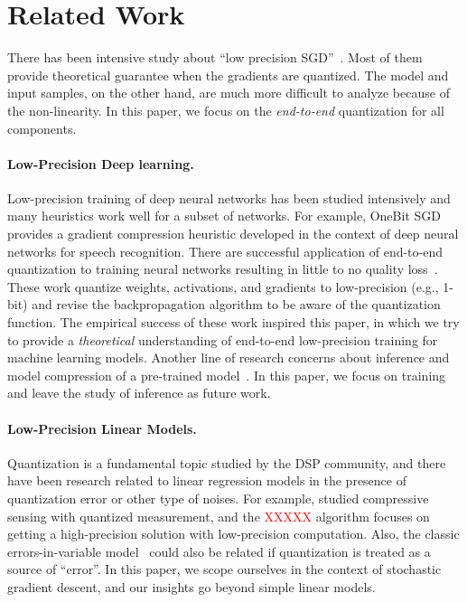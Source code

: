 \documentclass{article}
\begin{document}
\section{Related Work} 

There has been intensive study about ``low precision SGD''~\cite{DeSa:NIPS:2015,Alistarh:2016:ArXiv}. 
Most of them provide
theoretical guarantee when the gradients are quantized.
The model and input samples, on the other hand, are much more difficult
to analyze because of the non-linearity. In this paper, 
we
focus on the {\em end-to-end}
quantization for all components.

\vspace{-1em}
\paragraph{Low-Precision Deep learning.}

Low-precision training of deep neural networks has been studied
intensively and many heuristics work well for a subset of networks.
For example, OneBit SGD~\cite{Frank:2014:Interspeech} provides
a gradient compression heuristic developed in the context of deep 
neural networks for speech recognition. There are successful 
application of end-to-end quantization to training neural networks
resulting in little to no quality loss~\cite{hubara2016quantized,
rastegari2016xnor,zhou2016dorefa,miyashita2016convolutional,li2016ternary,gupta2015deep}. These work quantize weights, activations, and gradients 
to low-precision (e.g., 1-bit) and revise the backpropagation 
algorithm to be aware of the quantization function.
The empirical success of these work inspired this paper, in which we try
to provide a {\em theoretical} understanding of end-to-end low-precision
training for machine learning models.
Another line of research concerns about inference and model
compression of a pre-trained model~\cite{vanhoucke2011improving,gong2014compressing,han2015deep,lin2016fixed,kim2016bitwise,kim2015compression,wu2016quantized}.
In this paper, we focus on training and leave the study of
inference as future work.

\vspace{-1em}
\paragraph{Low-Precision Linear Models.}

Quantization is a fundamental topic studied by the
DSP community, and there have been research related to
linear regression models in the presence of quantization
error or other type of noises. For example,
\citet{Gopi:2013:ICML} studied compressive sensing
with quantized measurement, and the \textcolor{red}{XXXXX}
algorithm focuses on getting a high-precision solution
with low-precision computation. Also, the
classic errors-in-variable model~\cite{Hall:2008:Book}
could also be related if quantization is treated 
as a source of ``error''. In this paper, we scope
ourselves in the context of stochastic gradient descent, 
and our insights go beyond simple linear models.
\end{document}
